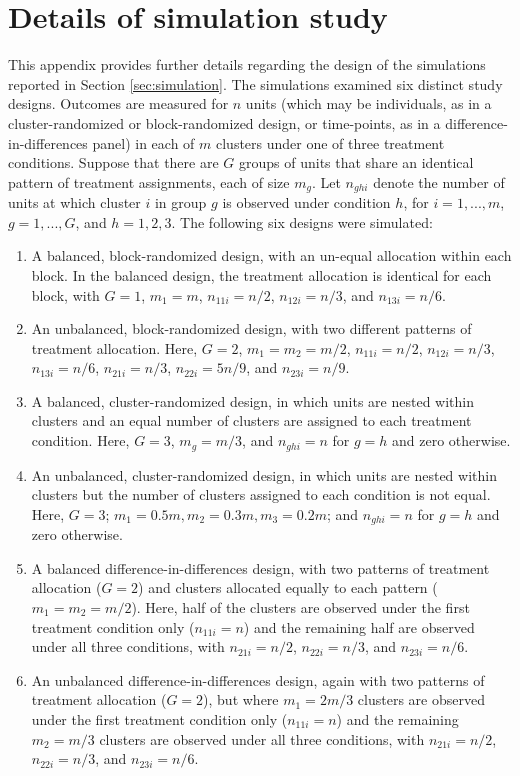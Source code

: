 \documentclass[draft]{ectaart}\usepackage[]{graphicx}\usepackage[]{color}
\begin{document}
\section{Details of simulation study}
\label{app:simulations}

This appendix provides further details regarding the design of the simulations reported in Section \ref{sec:simulation}. The simulations examined six distinct study designs. Outcomes are measured for $n$ units (which may be individuals, as in a cluster-randomized or block-randomized design, or time-points, as in a difference-in-differences panel) in each of $m$ clusters under one of three treatment conditions. Suppose that there are $G$ groups of units that share an identical pattern of treatment assignments, each of size $m_g$. Let $n_{ghi}$ denote the number of units at which cluster $i$ in group $g$ is observed under condition $h$, for $i=1,...,m$, $g = 1,...,G$, and $h = 1,2,3$. The following six designs were simulated:
\begin{enumerate}
\item A balanced, block-randomized design, with an un-equal allocation within each block. In the balanced design, the treatment allocation is identical for each block, with $G = 1$, $m_1 = m$, $n_{11i} = n / 2$, $n_{12i} = n / 3$, and $n_{13i} = n / 6$.
\item An unbalanced, block-randomized design, with two different patterns of treatment allocation. Here, $G = 2$,  $m_1 = m_2 = m / 2$, $n_{11i} = n / 2$, $n_{12i} = n / 3$, $n_{13i} = n / 6$, $n_{21i} = n / 3$, $n_{22i} = 5 n / 9$, and $n_{23i} = n / 9$.
\item A balanced, cluster-randomized design, in which units are nested within clusters and an equal number of clusters are assigned to each treatment condition. Here, $G = 3$, $m_g = m / 3$, and $n_{ghi} = n$ for $g = h$ and zero otherwise.
\item An unbalanced, cluster-randomized design, in which units are nested within clusters but the number of clusters assigned to each condition is not equal. Here, $G = 3$; $m_1 = 0.5 m, m_2 = 0.3 m, m_3 = 0.2 m$; and $n_{ghi} = n$ for $g = h$ and zero otherwise. 
\item A balanced difference-in-differences design, with two patterns of treatment allocation ($G = 2$) and clusters allocated equally to each pattern ($m_1 = m_2 = m / 2$). Here, half of the clusters are observed under the first treatment condition only ($n_{11i} = n$) and the remaining half are observed under all three conditions, with $n_{21i} = n / 2$, $n_{22i} = n / 3$, and $n_{23i} = n / 6$.
\item An unbalanced difference-in-differences design, again with two patterns of treatment allocation ($G = 2$), but where $m_1 = 2 m / 3$ clusters are observed under the first treatment condition only ($n_{11i} = n$) and the remaining $m_2 = m / 3$ clusters are observed under all three conditions, with  $n_{21i} = n / 2$, $n_{22i} = n / 3$, and $n_{23i} = n / 6$.
\end{enumerate}



\end{document}
